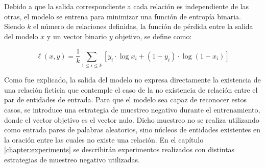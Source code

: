 Debido a que la salida correspondiente a cada relación es independiente de las otras, el modelo se entrena para minimizar una función de entropía binaria.
Siendo $k$ el número de relaciones definidas, la función de pérdida entre la salida del modelo $x$ y un vector binario $y$ objetivo, se define como:

\begin{equation*}
	\ell(x, y) = \frac{1}{k}\sum_{1\leq i\leq k}{\left[ y_i \cdot \log x_i + (1 - y_i) \cdot \log (1 - x_i) \right]}
\end{equation*}

Como fue explicado, la salida del modelo no expresa directamente la existencia de una relación ficticia que contemple el caso de la no existencia de relación entre el par de entidades de entrada.
Para que el modelo sea capaz de reconocer estos casos, se introduce una estrategia de muestreo negativo durante el entrenamiento, donde el vector objetivo es el vector nulo.
Dicho muestreo no se realiza utilizando como entrada pares de palabras aleatorios, sino núcleos de entidades existentes en la oración entre las cuales no existe una relación.
En el capítulo \ref{chapter:experiments} se describirán experimentos realizados con distintas estrategias de muestreo negativo utilizadas.

